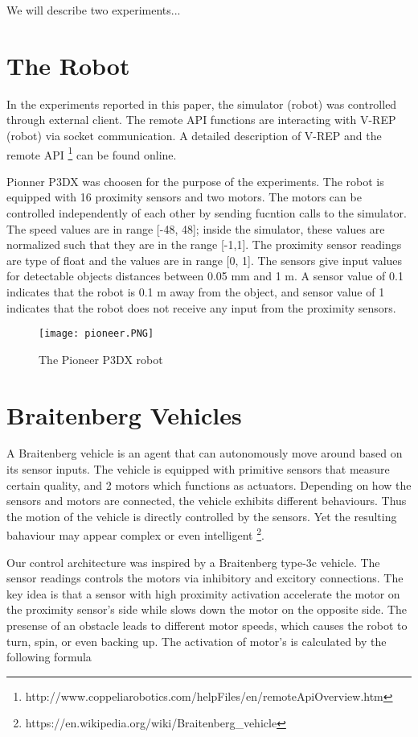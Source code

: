 \documentclass[format=acmsmall, review=false, screen=true]{acmart}
\begin{document}
We will describe two experiments...


\section{The Robot}

In the experiments reported in this paper, the simulator (robot) was controlled through external client. The remote API functions are interacting with V-REP (robot) via socket communication. A detailed description of V-REP and the remote API \footnote{http://www.coppeliarobotics.com/helpFiles/en/remoteApiOverview.htm} can be found online.

Pionner P3DX was choosen for the purpose of the experiments. The robot is equipped with 16 proximity sensors and two motors. The motors can be controlled independently of each other by sending fucntion calls to the simulator. The speed values are in range [-48, 48]; inside the simulator, these values are normalized such that they are in the range [-1,1]. The proximity sensor readings are type of float and the values are in range [0, 1]. The sensors give input values for detectable objects distances between 0.05 mm and 1 m. A sensor value of 0.1 indicates that the robot is 0.1 m away from the object, and sensor value of 1 indicates that the robot does not receive any input from the proximity sensors.

\begin{figure}[H]
  \texttt{[image: pioneer.PNG]}
  \caption{The Pioneer P3DX robot}
  \label{fig:pioneer-robot}
\end{figure}

\section{Braitenberg Vehicles}

A Braitenberg vehicle is an agent that can autonomously move around based on its sensor inputs. The vehicle is equipped with primitive sensors that measure certain quality, and 2 motors which functions as actuators. Depending on how the sensors and motors are connected, the vehicle exhibits different behaviours. Thus the motion of the vehicle is directly controlled by the sensors. Yet the resulting bahaviour may appear complex or even intelligent \footnote{https://en.wikipedia.org/wiki/Braitenberg_vehicle}.

Our control architecture was inspired by a Braitenberg type-3c vehicle. The sensor readings controls the motors via inhibitory and excitory connections. The key idea is that a sensor with high proximity activation accelerate the motor on the proximity sensor's side while slows down the motor on the opposite side. The presense of an obstacle leads to different motor speeds, which causes the robot to turn, spin, or even backing up. The activation of motor's is calculated by the following formula
\end{document}
